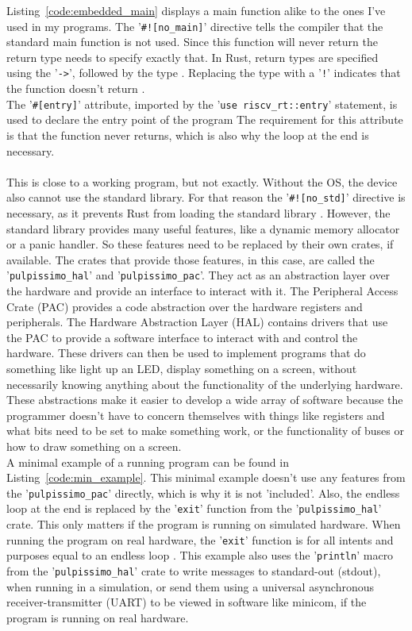 Listing~\ref{code:embedded_main} displays a main function alike to the ones I've used in my programs.
The '\lstinline{#![no_main]}' directive tells the compiler that the standard main function is not used.
Since this function will never return the return type needs to specify exactly that.
In Rust, return types are specified using the '\lstinline{->}', followed by the type \cite{rust_return}.
Replacing the type with a '\lstinline{!}' indicates that the function doesn't return \cite{rust_never_type}.
\\
The '\lstinline{#[entry]}' attribute, imported by the '\lstinline{use riscv_rt::entry}' statement, is used to declare the entry point of the program \cite{riscv_rt_entry}
The requirement for this attribute is that the function never returns, which is also why the loop at the end is necessary.
\\\\
This is close to a working program, but not exactly.
Without the OS, the device also cannot use the standard library.
For that reason the '\lstinline{#![no_std]}' directive is necessary, as it prevents Rust from loading the standard library \cite{rust_no_std}.
However, the standard library provides many useful features, like a dynamic memory allocator or a panic handler.
So these features need to be replaced by their own crates, if available.
The crates that provide those features, in this case, are called the '\lstinline{pulpissimo_hal}' and '\lstinline{pulpissimo_pac}'.
They act as an abstraction layer over the hardware and provide an interface to interact with it.
The Peripheral Access Crate (PAC) provides a code abstraction over the hardware registers and peripherals.
The Hardware Abstraction Layer (HAL) contains drivers that use the PAC to provide a software interface
to interact with and control the hardware.
These drivers can then be used to implement programs that do something like light up an LED, display something on a screen,
without necessarily knowing anything about the functionality of the underlying hardware.
These abstractions make it easier to develop a wide array of software because the programmer doesn't have to concern themselves
with things like registers and what bits need to be set to make something work, or the functionality of buses or how to draw
something on a screen.
\\
A minimal example of a running program can be found in Listing~\ref{code:min_example}.
This minimal example doesn't use any features from the '\lstinline{pulpissimo_pac}' directly, which is why it is not 'included'.
Also, the endless loop at the end is replaced by the '\lstinline{exit}' function from the '\lstinline{pulpissimo_hal}' crate.
This only matters if the program is running on simulated hardware. When running the program on real hardware, the '\lstinline{exit}' function is
for all intents and purposes equal to an endless loop \cite[Ch 4.3.10]{rust_pulp}.
This example also uses the '\lstinline{println}' macro from the '\lstinline{pulpissimo_hal}' crate to write messages
to standard-out (stdout), when running in a simulation, or send them using a universal asynchronous receiver-transmitter (UART)
to be viewed in software like minicom, if the program is running on real hardware.

